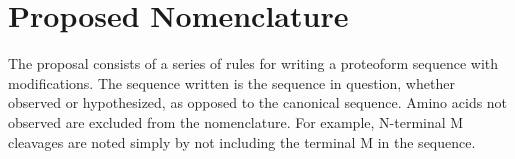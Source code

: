 
\section{Proposed Nomenclature}

The proposal consists of a series of rules for writing a proteoform sequence with modifications.  The sequence written is the sequence in question, whether observed or hypothesized, as opposed to the canonical sequence. Amino acids not observed are excluded from the nomenclature. For example, N-terminal M cleavages are noted simply by not including the terminal M in the sequence.
\\

